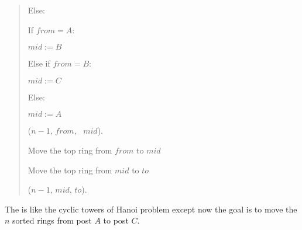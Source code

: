 \documentclass[10pt]{article}
\begin{document}
\begin{solution}
\begin{quote}
\begin{steps}
      \item Else: 
        \begin{steps}
        \item If \(from = A\):
          \begin{steps}
          \item \(mid := B\)
          \end{steps}
        \item Else if \(from = B\):
          \begin{steps}
          \item \(mid := C\)
          \end{steps}
        \item Else:
          \begin{steps}
          \item \(mid := A\)
          \end{steps}

        \item {}(\( n - 1 \), \( from \), \ \( mid \)).

        \item Move the top ring from \( from \) to \( mid \)

        \item Move the top ring from \( mid \) to \( to \)

        \item {}(\( n - 1 \), \( mid \), \( to \)).
        \end{steps}
  \end{steps}
\end{quote}
\end{solution}
\pagebreak

The  is like the cyclic towers of Hanoi problem except now the goal is to move the \( n \) sorted rings from post \( A \) to post \( C \).
\end{document}
